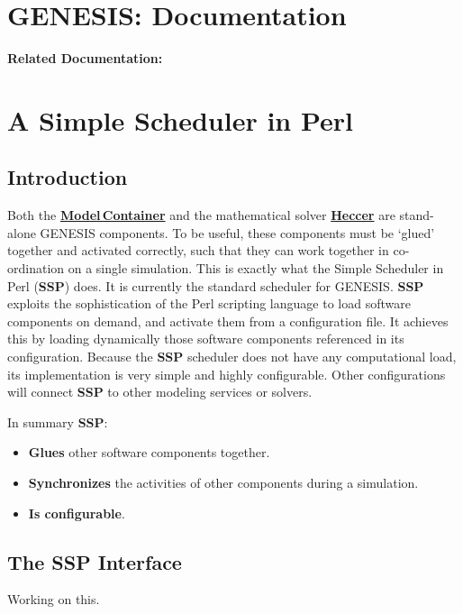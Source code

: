 \documentclass[12pt]{article}
\begin{document}
\section*{GENESIS: Documentation}

{\bf Related Documentation:}

\section*{A Simple Scheduler in Perl}

\subsection*{Introduction}

Both the \href{../model-container/model-container.tex}{\bf Model\,Container} and the mathematical solver \href{../heccer/heccer.tex}{\bf Heccer} are stand-alone GENESIS components. To be useful, these components must be `glued' together and activated correctly, such that they can work together in co-ordination on a single simulation. This is exactly what the Simple Scheduler in Perl ({\bf SSP}) does. It is currently the standard scheduler for GENESIS. {\bf SSP} exploits the sophistication of the Perl scripting language to load software components on demand, and activate them from a configuration file. It achieves this by loading dynamically those software components referenced in its configuration. Because the {\bf SSP} scheduler does not have any computational load, its implementation is very simple and highly configurable. Other configurations will connect {\bf SSP} to other modeling services or solvers.

In summary {\bf SSP}:

\begin{itemize}
\item {\bf Glues} other software components together.
\item {\bf Synchronizes} the activities of other components during a simulation.
\item {\bf Is configurable}. 
\end{itemize}

\subsection*{The SSP Interface}

Working on this.
\end{document}
